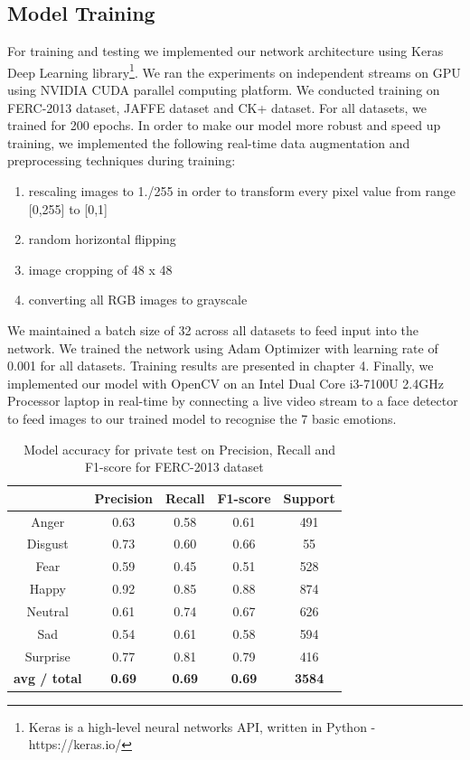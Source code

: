 \documentclass[master]{thesis-uestc}
\begin{document}
\subsection{Model Training}
For training and testing we implemented our network architecture using Keras Deep Learning library\footnote{Keras is a high-level neural networks API, written in Python - https://keras.io/}. We ran the experiments on independent streams on GPU using NVIDIA CUDA parallel computing platform. We conducted training on FERC-2013 dataset, JAFFE dataset and CK+ dataset. For all datasets, we trained for 200 epochs. In order to make our model more robust and speed up training, we implemented the following real-time data augmentation and preprocessing techniques during training:
\begin{enumerate}
 \item rescaling images to 1./255 in order to transform every pixel value from range [0,255] to [0,1]
 \item random horizontal flipping
 \item image cropping of 48 x 48
 \item converting all RGB images to grayscale
\end{enumerate}
We maintained a batch size of 32 across all datasets to feed input into the network. We trained the network using Adam Optimizer \cite{DBLP:journals/corr/KingmaB14} with learning rate of 0.001 for all datasets. Training results are presented in chapter 4. Finally, we implemented our model with OpenCV on an Intel Dual Core i3-7100U 2.4GHz Processor laptop in real-time by connecting a live video stream to a face detector to feed images to our trained model to recognise the 7 basic emotions.

\begin{table}[ht]
\renewcommand{\arraystretch}{1.3}
\caption{\,\,\,\,\,Model accuracy for private test on Precision, Recall and F1-score for FERC-2013 dataset}
\label{table_fer2013_scores_private}
\begin{center}
\begin{tabular}{|c|c|c|c|c|}

\hline
 & Precision & Recall & F1-score & Support\\ \hline

Anger & 0.63 & 0.58 & 0.61 & 491\\ \hline
Disgust & 0.73 & 0.60 & 0.66 & 55\\ \hline
Fear & 0.59 & 0.45 & 0.51 & 528\\ \hline
Happy & 0.92 & 0.85 & 0.88 & 874\\ \hline
Neutral & 0.61 & 0.74 & 0.67 & 626\\ \hline
Sad & 0.54 & 0.61 & 0.58 & 594\\ \hline
Surprise & 0.77 & 0.81 & 0.79 & 416\\ \hline

\textbf{avg / total} & \textbf{0.69} & \textbf{0.69} & \textbf{0.69} & \textbf{3584}\\ \hline
\end{tabular}
\end{center}
\end{table}
\end{document}
